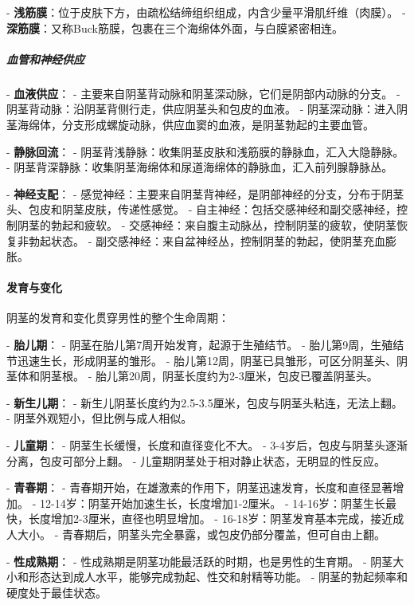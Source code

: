\begin{enumerate}
- \textbf{浅筋膜}：位于皮肤下方，由疏松结缔组织组成，内含少量平滑肌纤维（肉膜）。
- \textbf{深筋膜}：又称Buck筋膜，包裹在三个海绵体外面，与白膜紧密相连。

\subparagraph{血管和神经供应}

- \textbf{血液供应}：
  - 主要来自阴茎背动脉和阴茎深动脉，它们是阴部内动脉的分支。
  - 阴茎背动脉：沿阴茎背侧行走，供应阴茎头和包皮的血液。
  - 阴茎深动脉：进入阴茎海绵体，分支形成螺旋动脉，供应血窦的血液，是阴茎勃起的主要血管。

- \textbf{静脉回流}：
  - 阴茎背浅静脉：收集阴茎皮肤和浅筋膜的静脉血，汇入大隐静脉。
  - 阴茎背深静脉：收集阴茎海绵体和尿道海绵体的静脉血，汇入前列腺静脉丛。

- \textbf{神经支配}：
  - 感觉神经：主要来自阴茎背神经，是阴部神经的分支，分布于阴茎头、包皮和阴茎皮肤，传递性感觉。
  - 自主神经：包括交感神经和副交感神经，控制阴茎的勃起和疲软。
    - 交感神经：来自腹主动脉丛，控制阴茎的疲软，使阴茎恢复非勃起状态。
    - 副交感神经：来自盆神经丛，控制阴茎的勃起，使阴茎充血膨胀。

\paragraph{发育与变化}

阴茎的发育和变化贯穿男性的整个生命周期：

- \textbf{胎儿期}：
  - 阴茎在胎儿第7周开始发育，起源于生殖结节。
  - 胎儿第9周，生殖结节迅速生长，形成阴茎的雏形。
  - 胎儿第12周，阴茎已具雏形，可区分阴茎头、阴茎体和阴茎根。
  - 胎儿第20周，阴茎长度约为2-3厘米，包皮已覆盖阴茎头。

- \textbf{新生儿期}：
  - 新生儿阴茎长度约为2.5-3.5厘米，包皮与阴茎头粘连，无法上翻。
  - 阴茎外观短小，但比例与成人相似。

- \textbf{儿童期}：
  - 阴茎生长缓慢，长度和直径变化不大。
  - 3-4岁后，包皮与阴茎头逐渐分离，包皮可部分上翻。
  - 儿童期阴茎处于相对静止状态，无明显的性反应。

- \textbf{青春期}：
  - 青春期开始，在雄激素的作用下，阴茎迅速发育，长度和直径显著增加。
  - 12-14岁：阴茎开始加速生长，长度增加1-2厘米。
  - 14-16岁：阴茎生长最快，长度增加2-3厘米，直径也明显增加。
  - 16-18岁：阴茎发育基本完成，接近成人大小。
  - 青春期后，阴茎头完全暴露，或包皮仍部分覆盖，但可自由上翻。

- \textbf{性成熟期}：
  - 性成熟期是阴茎功能最活跃的时期，也是男性的生育期。
  - 阴茎大小和形态达到成人水平，能够完成勃起、性交和射精等功能。
  - 阴茎的勃起频率和硬度处于最佳状态。


\end{enumerate}
